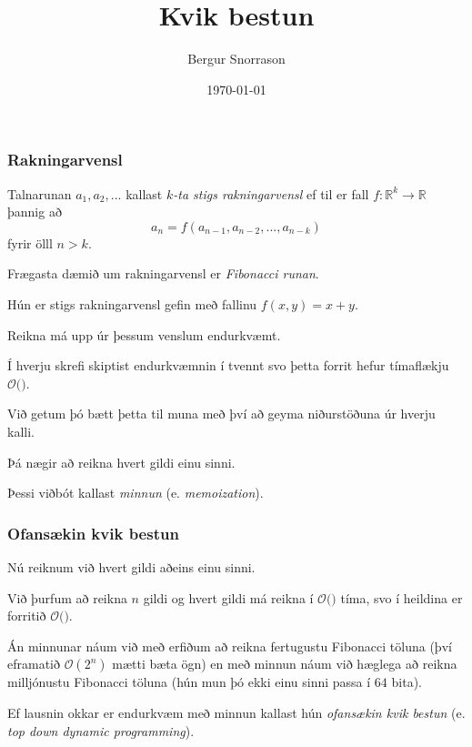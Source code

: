 \title{Kvik bestun}
\author{Bergur Snorrason}
\date{\today}



\frame{\titlepage}

{
    \frametitle{Rakningarvensl}
    {
        \item<1-> Talnarunan $a_1, a_2, ...$ kallast \emph{$k$-ta stigs rakningarvensl} ef til er fall
            $f \colon \mathbb{R}^k \rightarrow \mathbb{R}$ þannig að
            \[
            a_n = f(a_{n - 1}, a_{n - 2}, ..., a_{n - k})
                \]
                fyrir ölll $n > k$.
                \item<2-> Frægasta dæmið um rakningarvensl er \emph{Fibonacci runan}.
                \item<3-> Hún er  stigs rakningarvensl gefin með fallinu $f(x, y) = x + y$.
                \item<5-> Reikna má upp úr þessum venslum endurkvæmt.
                \item<6->[] 
    }
}

{
    {
        \item<1-> Í hverju skrefi skiptist endurkvæmnin í tvennt svo þetta forrit hefur tímaflækju $\mathcal{O}($$)$.
            \item<3-> Við getum þó bætt þetta til muna með því að geyma niðurstöðuna úr hverju kalli.
            \item<4-> Þá nægir að reikna hvert gildi einu sinni.
            \item<5-> Þessi viðbót kallast \emph{minnun} (e. \emph{memoization}).
    }
}

{
}

{
    \frametitle{Ofansækin kvik bestun}
    {
        \item<1-> Nú reiknum við hvert gildi aðeins einu sinni.
            \item<2-> Við þurfum að reikna $n$ gildi og hvert gildi má reikna í $\mathcal{O}($$)$ tíma, svo í heildina er forritið
            $\mathcal{O}($$)$.
            \item<5-> Án minnunar náum við með erfiðum að reikna fertugustu Fibonacci töluna (því eframatið $\mathcal{O}(2^n)$ mætti bæta ögn)
            en með minnun náum við hæglega að reikna milljónustu Fibonacci töluna (hún mun þó ekki einu sinni passa í $64$ bita).
            \item<6-> Ef lausnin okkar er endurkvæm með minnun kallast hún \emph{ofansækin kvik bestun} (e. \emph{top down dynamic programming}).
    }
}

